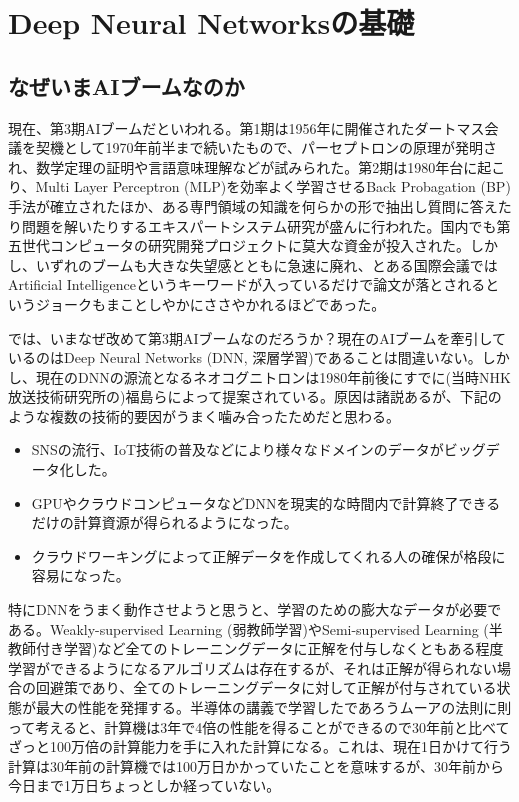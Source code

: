 \section{Deep Neural Networksの基礎}
\subsection{なぜいまAIブームなのか}
現在、第3期AIブームだといわれる。第1期は1956年に開催されたダートマス会議を契機として1970年前半まで続いたもので、パーセプトロンの原理が発明され、数学定理の証明や言語意味理解などが試みられた。第2期は1980年台に起こり、Multi Layer Perceptron (MLP)を効率よく学習させるBack Probagation (BP)手法が確立されたほか、ある専門領域の知識を何らかの形で抽出し質問に答えたり問題を解いたりするエキスパートシステム研究が盛んに行われた。国内でも第五世代コンピュータの研究開発プロジェクトに莫大な資金が投入された。しかし、いずれのブームも大きな失望感とともに急速に廃れ、とある国際会議ではArtificial Intelligenceというキーワードが入っているだけで論文が落とされるというジョークもまことしやかにささやかれるほどであった。

では、いまなぜ改めて第3期AIブームなのだろうか？現在のAIブームを牽引しているのはDeep Neural Networks (DNN, 深層学習)であることは間違いない。しかし、現在のDNNの源流となるネオコグニトロンは1980年前後にすでに(当時NHK放送技術研究所の)福島ら\cite{fukushima79,fukushima80,fukushima83}によって提案されている。原因は諸説あるが、下記のような複数の技術的要因がうまく噛み合ったためだと思わる。
\begin{itemize}
\item SNSの流行、IoT技術の普及などにより様々なドメインのデータがビッグデータ化した。
\item GPUやクラウドコンピュータなどDNNを現実的な時間内で計算終了できるだけの計算資源が得られるようになった。
\item クラウドワーキングによって正解データを作成してくれる人の確保が格段に容易になった。
\end{itemize}
特にDNNをうまく動作させようと思うと、学習のための膨大なデータが必要である。Weakly-supervised Learning (弱教師学習)やSemi-supervised Learning (半教師付き学習)など全てのトレーニングデータに正解を付与しなくともある程度学習ができるようになるアルゴリズムは存在するが、それは正解が得られない場合の回避策であり、全てのトレーニングデータに対して正解が付与されている状態が最大の性能を発揮する。半導体の講義で学習したであろうムーアの法則に則って考えると、計算機は3年で4倍の性能を得ることができるので30年前と比べてざっと100万倍の計算能力を手に入れた計算になる。これは、現在1日かけて行う計算は30年前の計算機では100万日かかっていたことを意味するが、30年前から今日まで1万日ちょっとしか経っていない。

